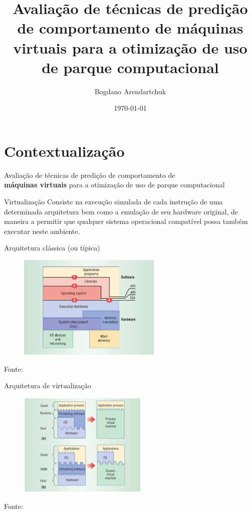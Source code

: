 \documentclass{beamer}
\institute{Universidade Tuiuti do Paraná}
\author{Bogdano Arendartchuk}
\title{Avaliação de técnicas de predição de comportamento de máquinas
virtuais para a otimização de uso de parque computacional}
\date{\today}
\begin{document}
\frame{\titlepage}

\section{Contextualização}

\begin{frame}{}
\begin{block}{}
\centering
Avaliação de técnicas de predição de comportamento de \\
\textbf{{\color{red}máquinas virtuais}}
para a otimização de uso de parque computacional
\end{block}
\end{frame}

\begin{frame}
\begin{block}{Virtualização}
Consiste na execução simulada de cada instrução de uma determinada
arquitetura bem como a emulação de seu hardware original, de maneira a
permitir que qualquer sistema operacional compatível possa também executar
neste ambiente.\cite{goldberg1974survey}
\end{block}
\end{frame}

\begin{frame}{Arquitetura clássica (ou típica)}
\begin{figure}
\centering
\includegraphics[height=5cm]{img-smith2005cla.png}
\end{figure}
\tiny{Fonte: \cite{smith2005architecture}}
\end{frame}

\begin{frame}{Arquitetura de virtualização}
\begin{figure}
\centering
\includegraphics[height=5cm]{img-smith2005vir.png}
\end{figure}
\tiny{Fonte: \cite{smith2005architecture}}
\end{frame}
\end{document}
